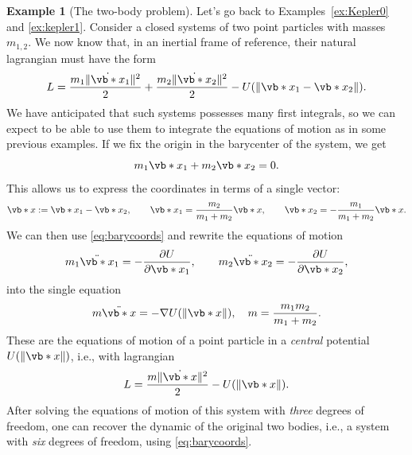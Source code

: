 \documentclass[english,fontsize=11pt,paper=b5]{scrbook}
\numberwithin{equation}{chapter}
\theoremstyle{definition}
\newtheorem{example}{Example}[chapter]
\begin{document}
    \begin{example}[The two-body problem]\label{ex:kepler2}
      Let's go back to Examples~\ref{ex:Kepler0} and \ref{ex:kepler1}.
      Consider a closed systems of two point particles with masses $m_{1,2}$.
      We now know that, in an inertial frame of reference, their natural lagrangian must have the form
      \begin{equation}
        L = \frac{m_1 \|\dot{\vb*{x}}_1\|^2}{2} + \frac{m_2 \|\dot{\vb*{x}}_2\|^2}{2} - U(\|\vb*{x}_1 - \vb*{x}_2\|).
      \end{equation}
      We have anticipated that such systems possesses many first integrals, so we can expect to be able to use them to integrate the equations of motion as in some previous examples.
      If we fix the origin in the barycenter of the system, we get
      \begin{equation}
        m_1 \vb*{x}_1 + m_2 \vb*{x}_2 = 0.
      \end{equation}
      This allows us to express the coordinates in terms of a single vector:
      \begin{equation}\label{eq:barycoords}
        \vb*{x} := \vb*{x}_1 - \vb*{x}_2, \qquad
        \vb*{x}_1 = \frac{m_2}{m_1 + m_2} \vb*{x}, \qquad
        \vb*{x}_2 = -\frac{m_1}{m_1 + m_2} \vb*{x}.
      \end{equation}
      We can then use \eqref{eq:barycoords} and rewrite the equations of motion
      \begin{equation}
        m_1 \ddot{\vb*{x}}_1 = -\frac{\partial U}{\partial \vb*{x}_1}, \qquad m_2 \ddot{\vb*{x}}_2 = -\frac{\partial U}{\partial \vb*{x}_2},
      \end{equation}
      into the single equation
      \begin{equation}
        m \ddot{\vb*{x}} = -\nabla U(\|\vb*{x}\|), \quad m = \frac{m_1m_2}{m_1+m_2}.
      \end{equation}
      These are the equations of motion of a point particle in a \emph{central} potential $U(\|\vb*{x}\|)$, i.e., with lagrangian
      \begin{equation}\label{eq:centralpot}
        L = \frac{m \|\dot{\vb*{x}}\|^2}{2} - U(\|\vb*{x}\|).
      \end{equation}
      After solving the equations of motion of this system with \emph{three} degrees of freedom, one can recover the dynamic of the original two bodies, i.e., a system with \emph{six} degrees of freedom, using \eqref{eq:barycoords}.
    \end{example}
\end{document}
